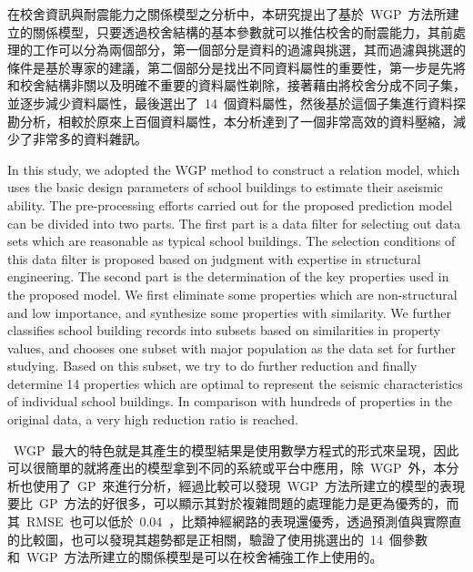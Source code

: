 在校舍資訊與耐震能力之關係模型之分析中，本研究提出了基於~WGP~方法所建立的關係模型，只要透過校舍結構的基本參數就可以推估校舍的耐震能力，其前處理的工作可以分為兩個部分，第一個部分是資料的過濾與挑選，其而過濾與挑選的條件是基於專家的建議，第二個部分是找出不同資料屬性的重要性，第一步是先將和校舍結構非關以及明確不重要的資料屬性剃除，接著藉由將校舍分成不同子集，並逐步減少資料屬性，最後選出了~14~個資料屬性，然後基於這個子集進行資料探勘分析，相較於原來上百個資料屬性，本分析達到了一個非常高效的資料壓縮，減少了非常多的資料雜訊。

In this study, we adopted the WGP method to construct a relation model, which uses the basic design parameters of school buildings to estimate their aseismic ability. The pre-processing efforts carried out for the proposed prediction model can be divided into two parts. The first part is a data filter for selecting out data sets which are reasonable as typical school buildings. The selection conditions of this data filter is proposed based on judgment with expertise in structural engineering. The second part is the determination of the key properties used in the proposed model. We first eliminate some properties which are non-structural and low importance, and synthesize some properties with similarity. We further classifies school building records into subsets based on similarities in property values, and chooses one subset with major population as the data set for further studying. Based on this subset, we try to do further reduction and finally determine 14 properties which are optimal to represent the seismic characteristics of individual school buildings. In comparison with hundreds of properties in the original data, a very high reduction ratio is reached.

~WGP~最大的特色就是其產生的模型結果是使用數學方程式的形式來呈現，因此可以很簡單的就將產出的模型拿到不同的系統或平台中應用，除~WGP~外，本分析也使用了~GP~來進行分析，經過比較可以發現~WGP~方法所建立的模型的表現要比~GP~方法的好很多，可以顯示其對於複雜問題的處理能力是更為優秀的，而其~RMSE~也可以低於~0.04~，比類神經網路的表現還優秀，透過預測值與實際直的比較圖，也可以發現其趨勢都是正相關，驗證了使用挑選出的~14~個參數和~WGP~方法所建立的關係模型是可以在校舍補強工作上使用的。

